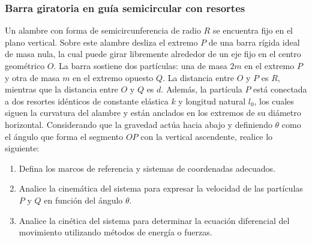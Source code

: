 \subsubsection{Barra giratoria en guía semicircular con resortes}

Un alambre con forma de semicircunferencia de radio $R$ se encuentra fijo en el plano vertical. Sobre este alambre desliza el extremo $P$ de una barra rígida ideal de masa nula, la cual puede girar libremente alrededor de un eje fijo en el centro geométrico $O$. La barra sostiene dos partículas: una de masa $2m$ en el extremo $P$ y otra de masa $m$ en el extremo opuesto $Q$. La distancia entre $O$ y $P$ es $R$, mientras que la distancia entre $O$ y $Q$ es $d$. Además, la partícula $P$ está conectada a dos resortes idénticos de constante elástica $k$ y longitud natural $l_0$, los cuales siguen la curvatura del alambre y están anclados en los extremos de su diámetro horizontal. Considerando que la gravedad actúa hacia abajo y definiendo $\theta$ como el ángulo que forma el segmento $OP$ con la vertical ascendente, realice lo siguiente:

\begin{enumerate}
    \item Defina los marcos de referencia y sistemas de coordenadas adecuados.
    \item Analice la cinemática del sistema para expresar la velocidad de las partículas $P$ y $Q$ en función del ángulo $\theta$.
    \item Analice la cinética del sistema para determinar la ecuación diferencial del movimiento utilizando métodos de energía o fuerzas.
\end{enumerate}

